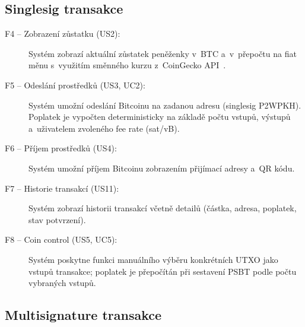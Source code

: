 \subsection{Singlesig transakce}

\begin{description}
  \item[F4 -- Zobrazení zůstatku \textnormal{(US2)}:]
    Systém zobrazí aktuální zůstatek peněženky v~BTC a~v~přepočtu na fiat
    měnu s~využitím směnného kurzu z~CoinGecko API~\cite{CoinGeckoAPI}.

  \item[F5 -- Odeslání prostředků \textnormal{(US3, UC2)}:]
    Systém umožní odeslání Bitcoinu na zadanou adresu (singlesig P2WPKH).
    Poplatek je vypočten deterministicky na základě počtu vstupů, výstupů
    a~uživatelem zvoleného fee rate (sat/vB).

  \item[F6 -- Příjem prostředků \textnormal{(US4)}:]
    Systém umožní příjem Bitcoinu zobrazením přijímací adresy a~QR kódu.

  \item[F7 -- Historie transakcí \textnormal{(US11)}:]
    Systém zobrazí historii transakcí včetně detailů (částka, adresa,
    poplatek, stav potvrzení).

  \item[F8 -- Coin control \textnormal{(US5, UC5)}:]
    Systém poskytne funkci manuálního výběru konkrétních UTXO jako vstupů
    transakce; poplatek je přepočítán při sestavení PSBT podle počtu
    vybraných vstupů.
\end{description}

\subsection{Multisignature transakce}

